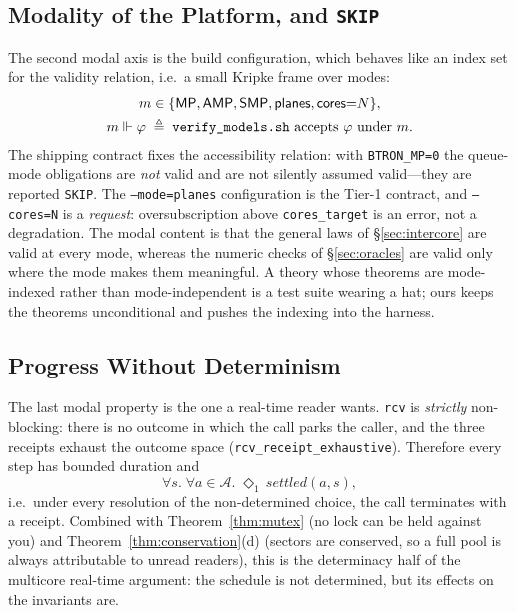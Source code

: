 \documentclass[10pt,journal,compsoc,twocolumn]{article}
\theoremstyle{definition}
\theoremstyle{remark}
\theoremstyle{plain}
\newcommand{\ctr}[1]{\texttt{#1}}
\begin{document}
\subsection{Modality of the Platform, and \texorpdfstring{\ctr{SKIP}}{SKIP}}
\label{sec:modes}
The second modal axis is the build configuration, which behaves like an index set for the validity relation, i.e.\ a small Kripke frame over modes:
\begin{equation}
\begin{gathered}
m \in \{ \mathsf{MP}, \mathsf{AMP}, \mathsf{SMP}, \mathsf{planes}, \mathsf{cores}{=}N \}, \\
m \Vdash \varphi \;\triangleq\; \text{\ctr{verify\_models.sh} accepts }\varphi\text{ under }m .
\end{gathered}
\end{equation}
The shipping contract fixes the accessibility relation: with \ctr{BTRON\_MP=0} the queue-mode obligations are \emph{not} valid and are not silently assumed valid---they are reported \ctr{SKIP}. The \ctr{--mode=planes} configuration is the Tier-1 contract, and \ctr{--cores=N} is a \emph{request}: oversubscription above \ctr{cores\_target} is an error, not a degradation. The modal content is that the general laws of \S\ref{sec:intercore} are valid at every mode, whereas the numeric checks of \S\ref{sec:oracles} are valid only where the mode makes them meaningful. A theory whose theorems are mode-indexed rather than mode-independent is a test suite wearing a hat; ours keeps the theorems unconditional and pushes the indexing into the harness.

\subsection{Progress Without Determinism}
The last modal property is the one a real-time reader wants. \ctr{rcv} is \emph{strictly} non-blocking: there is no outcome in which the call parks the caller, and the three receipts exhaust the outcome space (\ctr{rcv\_receipt\_exhaustive}). Therefore every step has bounded duration and
\begin{equation}
\forall s.\; \forall a \in \mathcal{A}.\; \Diamond_1\,\mathit{settled}(a, s),
\end{equation}
i.e.\ under every resolution of the non-determined choice, the call terminates with a receipt. Combined with Theorem~\ref{thm:mutex} (no lock can be held against you) and Theorem~\ref{thm:conservation}(d) (sectors are conserved, so a full pool is always attributable to unread readers), this is the determinacy half of the multicore real-time argument: the schedule is not determined, but its effects on the invariants are.
\end{document}
